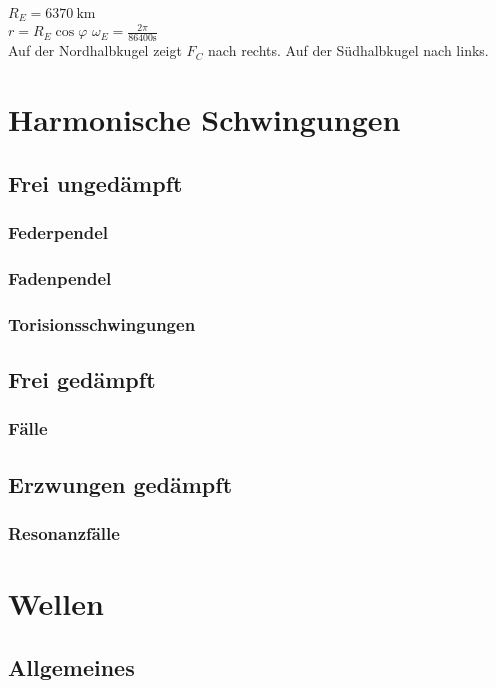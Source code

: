 \documentclass[german, 8pt]{latex4ei/latex4ei_sheet}
\begin{document}
$R_E=\SI{6370}{\kilo \meter}$\\
$r=R_E \cos \varphi$
$\omega_E=\frac{2\pi}{86400\si{\second}}$\\
Auf der Nordhalbkugel zeigt $F_C$ nach rechts. Auf der Südhalbkugel nach links.


\section{Harmonische Schwingungen}
\subsection{Frei ungedämpft}
\subsubsection{Federpendel}
\subsubsection{Fadenpendel}
\subsubsection{Torisionsschwingungen}
\subsection{Frei gedämpft}
\subsubsection{Fälle}
\subsection{Erzwungen gedämpft}
\subsubsection{Resonanzfälle}

\section{Wellen}
\subsection{Allgemeines}
\end{document}
